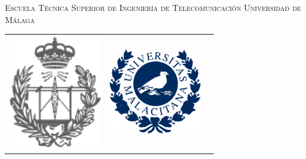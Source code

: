 

\begin{spacing}{1}
\begin{titlepage}
	\begin{center}
		\Large{\textsc{\textsf{		Escuela Técnica Superior de Ingeniería de Telecomunicación Universidad de Málaga}}}
	\end{center}
	
	\bigskip
	 
	\begin{center}
		\begin{tabular}{lcr}
			\includegraphics[width=4cm,keepaspectratio]{graphs/EscudoETSIT.pdf} & \hspace{2cm}
			\includegraphics[width=4cm,keepaspectratio]{graphs/UnivMalacitana.pdf}
		\end{tabular}
	\end{center}
	

\end{titlepage}
\end{spacing}
